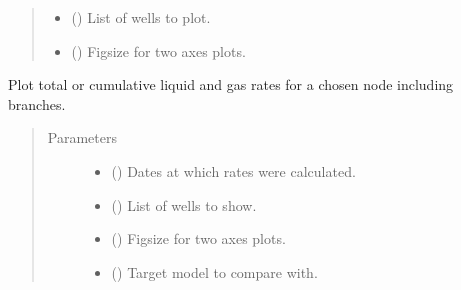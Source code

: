 \documentclass[letterpaper,10pt,english]{sphinxmanual}
\begin{document}
\begin{fulllineitems}
\begin{fulllineitems}
\begin{quote}
\begin{description}
\begin{itemize}
\item {} 
 () \textendash{} List of wells to plot.

\item {} 
 () \textendash{} Figsize for two axes plots.

\end{itemize}

\end{description}\end{quote}

\end{fulllineitems}


\begin{fulllineitems}
\label{\detokenize{api/wells:geology.src.wells.Wells.show_rates}}
Plot total or cumulative liquid and gas rates for a chosen node including branches.
\begin{quote}\begin{description}
\item[{Parameters}] \leavevmode\begin{itemize}
\item {} 
 () \textendash{} Dates at which rates were calculated.

\item {} 
 () \textendash{} List of wells to show.

\item {} 
 () \textendash{} Figsize for two axes plots.

\item {} 
 ({\hyperref[\detokenize{api/wells:geology.src.wells.Wells}]{}}) \textendash{} Target model to compare with.


\end{itemize}
\end{description}
\end{quote}
\end{fulllineitems}
\end{fulllineitems}
\end{document}
